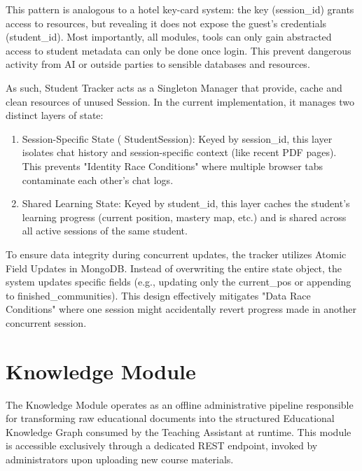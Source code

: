 This pattern is analogous to a hotel key-card system: the key (session\_id) grants access to resources, but revealing it does not expose the guest's credentials 
(student\_id). Most importantly, all modules, tools can only gain abstracted access to student metadata can only be done once login. This prevent dangerous activity 
from AI or outside parties to sensible databases and resources.

As such, {Student Tracker} acts as a Singleton Manager that provide, cache and clean resources of unused Session. In the current implementation, 
it manages two distinct layers of state:

\begin{enumerate}
    \item {Session-Specific State ( {StudentSession})}: Keyed by  {session\_id}, this layer isolates chat history and session-specific context (like recent PDF pages). This prevents "Identity Race Conditions" where multiple browser tabs contaminate each other's chat logs.
    \item {Shared Learning State}: Keyed by  {student\_id}, this layer caches the student's learning progress (current position, mastery map, etc.) and is shared across all active sessions of the same student.
\end{enumerate}

To ensure data integrity during concurrent updates, the tracker utilizes {Atomic Field Updates} in MongoDB. 
Instead of overwriting the entire state object, the system updates specific fields (e.g., updating only the  {current\_pos} or appending to  {finished\_communities}). 
This design effectively mitigates "Data Race Conditions" where one session might accidentally revert progress made in another concurrent session.

\section{Knowledge Module}\label{sec:knowledge_module}

The Knowledge Module operates as an offline administrative pipeline responsible for transforming raw educational documents into the structured Educational Knowledge Graph consumed by the Teaching Assistant at runtime. This module is accessible exclusively through a dedicated REST endpoint, invoked by administrators upon uploading new course materials.

